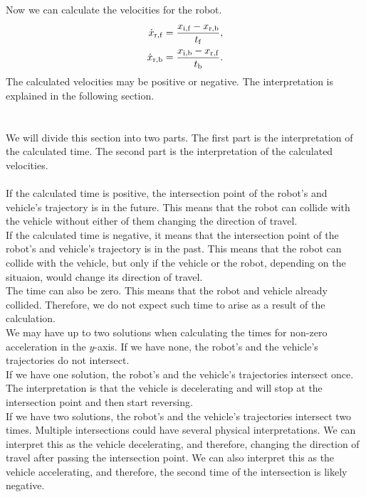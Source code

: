         Now we can calculate the velocities for the robot.
        \begin{align}
            \dot{x}_{\rm{r,f}} &= \frac{x_{\rm{i,f}}-x_{\rm{r,b}}}{t_{\rm{f}}},\\
            \dot{x}_{\rm{r,b}} &= \frac{x_{\rm{i,b}}-x_{\rm{r,f}}}{t_{\rm{b}}}.
        \end{align}
        The calculated velocities may be positive or negative. The interpretation is explained in the following section.\\\\
    \\
        We will divide this section into two parts. The first part is the interpretation of the calculated time. The second part is the interpretation of the calculated velocities.\\\\
        If the calculated time is positive, the intersection point of the robot's and vehicle's trajectory is in the future. This means that the robot can collide with the vehicle without either of them changing the direction of travel.\\
        If the calculated time is negative, it means that the intersection point of the robot's and vehicle's trajectory is in the past. This means that the robot can collide with the vehicle, but only if the vehicle or the robot, depending on the situaion, would change its direction of travel.\\
        The time can also be zero. This means that the robot and vehicle already collided. Therefore, we do not expect such time to arise as a result of the calculation.\\
        We may have up to two solutions when calculating the times for non-zero acceleration in the $y$-axis. If we have none, the robot's and the vehicle's trajectories do not intersect.\\
        If we have one solution, the robot's and the vehicle's trajectories intersect once. The interpretation is that the vehicle is decelerating and will stop at the intersection point and then start reversing.\\
        If we have two solutions, the robot's and the vehicle's trajectories intersect two times. Multiple intersections could have several physical interpretations. We can interpret this as the vehicle decelerating, and therefore, changing the direction of travel after passing the intersection point. We can also interpret this as the vehicle accelerating, and therefore, the second time of the intersection is likely negative.\\
